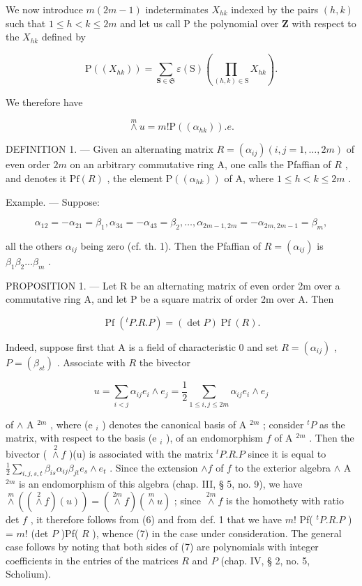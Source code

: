 We now introduce \(m(2m-1)\) indeterminates \(X_{hk}\) indexed by the pairs \((h,k)\) such that \(1\leqslant h<k\leqslant2m\) and let us call P the polynomial over \(\mathbf{Z}\) with respect to the \(X_{hk}\) defined by

\[
\mathrm{P} ((X _ {h k})) = \sum_ {\mathbf {S} \in \mathfrak {S}} \varepsilon (\mathrm{S}) (\prod_ {(h, k) \in \mathrm{S}} X _ {h k}).\tag{5}
\]

We therefore have

\[
\stackrel {m} {\wedge} u = m! \mathrm{P} ((\alpha_ {h k})). e.\tag{6}
\]

DEFINITION 1. --- Given an alternating matrix \(R = (\alpha_{ij}) (i, j = 1, \ldots, 2m)\) of even order \(2m\) on an arbitrary commutative ring A, one calls the Pfaffian of \(R\) , and denotes it \(\mathrm{Pf}(R)\) , the element \(\mathrm{P}((\alpha_{hk}))\) of A, where \(1 \leqslant h < k \leqslant 2m\) .

Example. --- Suppose:

\[
\alpha_ {1 2} = - \alpha_ {2 1} = \beta_ {1}, \alpha_ {3 4} = - \alpha_ {4 3} = \beta_ {2}, \dots , \alpha_ {2 m - 1, 2 m} = - \alpha_ {2 m, 2 m - 1} = \beta_ {m},
\]

all the others \(\alpha_{ij}\) being zero (cf. th. 1). Then the Pfaffian of \(R = (\alpha_{ij})\) is \(\beta_1\beta_2\ldots\beta_m\) .

PROPOSITION 1. --- Let R be an alternating matrix of even order 2m over a commutative ring A, and let P be a square matrix of order 2m over A. Then

\[
\operatorname{Pf} (^ {t} P. R. P) = (\det P) \operatorname{Pf} (R).\tag{7}
\]

Indeed, suppose first that A is a field of characteristic 0 and set \(R = (\alpha_{ij})\) , \(P = (\beta_{st})\) . Associate with \(R\) the bivector

\[
u = \sum_ {i <   j} \alpha_ {i j} e _ {i} \wedge e _ {j} = \frac {1}{2} \sum_ {1 \leqslant i, j \leqslant 2 m} \alpha_ {i j} e _ {i} \wedge e _ {j}
\]

of \(\wedge\) A \(^{2m}\) , where (e \(_i\) ) denotes the canonical basis of A \(^{2m}\) ; consider \(^t P\) as the matrix, with respect to the basis (e \(_i\) ), of an endomorphism \(f\) of A \(^{2m}\) . Then the bivector ( \(\overset{2}{\wedge} f\) )(u) is associated with the matrix \(^t P.R.P\) since it is equal to \(\frac{1}{2}\sum_{i,j,s,t}\beta_{is}\alpha_{ij}\beta_{jt}e_s\wedge e_t\) . Since the extension \(\wedge f\) of \(f\) to the exterior algebra \(\wedge\) A \(^{2m}\) is an endomorphism of this algebra (chap. III, § 5, no. 9), we have \(\overset{m}{\wedge}((\overset{2}{\wedge}f)(u)) = (\overset{2m}{\wedge}f)(\overset{m}{\wedge}u)\) ; since \(\overset{2m}{\wedge} f\) is the homothety with ratio det \(f\) , it therefore follows from (6) and from def. 1 that we have \(m!\) Pf( \(^t P.R.P\) ) = \(m!\) (det \(P\) )Pf( \(R\) ), whence (7) in the case under consideration. The general case follows by noting that both sides of (7) are polynomials with integer coefficients in the entries of the matrices \(R\) and \(P\) (chap. IV, § 2, no. 5, Scholium).

